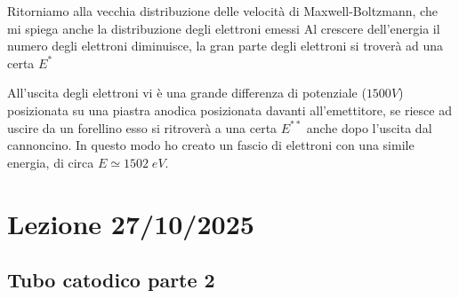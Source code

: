 \documentclass{article}
\begin{document}
Ritorniamo alla vecchia distribuzione delle velocità di Maxwell-Boltzmann, che mi spiega anche la distribuzione 
degli elettroni emessi
Al crescere dell'energia il numero degli elettroni diminuisce, la gran parte degli elettroni si troverà ad una certa $E^*$

\begin{center}
\end{center}

All'uscita degli elettroni vi è una grande differenza di potenziale ($1500V$) posizionata su una piastra anodica posizionata davanti all'emettitore, se riesce ad uscire da un forellino esso si ritroverà 
a una certa $E^{**}$ anche dopo l'uscita dal cannoncino.
In questo modo ho creato un fascio di elettroni con una simile energia, di circa $E \simeq 1502 \; eV$.
\section{Lezione 27/10/2025}
\subsection{Tubo catodico parte 2}
\end{document}
